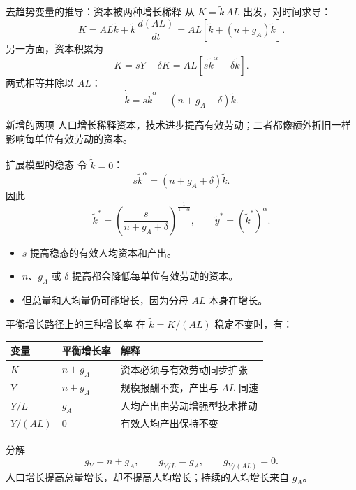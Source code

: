 \documentclass[aspectratio=32]{beamer}
\begin{document}
\begin{frame}{去趋势变量的推导：资本被两种增长稀释}
\small
从 $K=\tilde k\,A L$ 出发，对时间求导：
\[
  \dot K=AL\dot{\tilde k}+\tilde k\,\frac{d(AL)}{dt}
  =AL\left[\dot{\tilde k}+(n+g_A)\tilde k\right].
\]
另一方面，资本积累为
\[
  \dot K=sY-\delta K
  =AL\left[s\tilde k^\alpha-\delta\tilde k\right].
\]
两式相等并除以 $AL$：
\[
  \boxed{\dot{\tilde k}=s\tilde k^\alpha-(n+g_A+\delta)\tilde k}.
\]
\begin{alertblock}{新增的两项}
人口增长稀释资本，技术进步提高有效劳动；二者都像额外折旧一样影响每单位有效劳动的资本。
\end{alertblock}
\end{frame}

\begin{frame}{扩展模型的稳态}
\small
令 $\dot{\tilde k}=0$：
\[
  s\tilde k^\alpha=(n+g_A+\delta)\tilde k.
\]
因此
\[
  \boxed{\tilde k^*=\left(\frac{s}{n+g_A+\delta}\right)^{\frac{1}{1-\alpha}}},
  \qquad
  \tilde y^*=(\tilde k^*)^\alpha.
\]
\begin{itemize}
  \item $s$ 提高稳态的有效人均资本和产出。
  \item $n$、$g_A$ 或 $\delta$ 提高都会降低每单位有效劳动的资本。
  \item 但总量和人均量仍可能增长，因为分母 $AL$ 本身在增长。
\end{itemize}
\end{frame}

\begin{frame}{平衡增长路径上的三种增长率}
\scriptsize
在 $\tilde k=K/(AL)$ 稳定不变时，有：
\begin{table}
\centering
\begin{tabular}{p{}p{}p{}}
\toprule
变量 & 平衡增长率 & 解释 \\
\midrule
$K$ & $n+g_A$ & 资本必须与有效劳动同步扩张 \\
$Y$ & $n+g_A$ & 规模报酬不变，产出与 $AL$ 同速 \\
$Y/L$ & $g_A$ & 人均产出由劳动增强型技术推动 \\
$Y/(AL)$ & $0$ & 有效人均产出保持不变 \\
\bottomrule
\end{tabular}
\end{table}
\vspace{0.12cm}
\begin{block}{分解}
\[
  g_Y=n+g_A,\qquad g_{Y/L}=g_A,
  \qquad g_{Y/(AL)}=0.
\]
人口增长提高总量增长，却不提高人均增长；持续的人均增长来自 $g_A$。
\end{block}
\end{frame}
\end{document}
